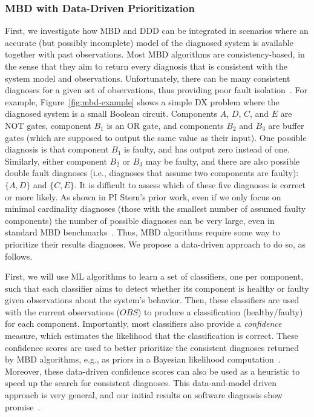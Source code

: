\documentclass[12pt]{article}
\begin{document}
\subsubsection{MBD with Data-Driven Prioritization} 
First, we investigate how MBD and DDD can be integrated in scenarios where an accurate (but possibly incomplete) model of the diagnosed system is available together with past observations. 
Most MBD algorithms are consistency-based, in the sense that they aim to return every diagnosis  that is consistent with the system model and observations. 
Unfortunately, there can be many consistent diagnoses for a given set of observations, thus providing poor fault isolation~\cite{stern2015many}. 
For example, Figure~\ref{fig:mbd-example} shows a simple DX problem where the diagnosed system is a small Boolean circuit. Components $A$, $D$, $C$, and $E$ are NOT gates, component $B_1$ is an OR gate, and components $B_2$ and $B_3$ are buffer gates (which are supposed to output the same value as their input). One possible diagnosis is that component $B_1$ is faulty, and has output zero instead of one. Similarly, either component $B_2$ or $B_3$ may be faulty, 
and there are also possible double fault diagnoses (i.e., diagnoses that assume two components are faulty): $\{ A,D \}$ and $\{C,E\}$. It is difficult to assess which of these five diagnoses is correct or more likely. 
As shown in PI Stern's prior work, even if we only focus on minimal cardinality diagnoses (those with the smallest number of assumed faulty components) the number of possible diagnoses can be very large, even in standard MBD benchmarks~\cite{stern2015many}. Thus, MBD algorithms require some way to prioritize their results diagnoses. We propose a data-driven approach to do so, as follows. 


First, we will use ML algorithms to learn a set of classifiers, one per component, such that each classifier aims to detect whether its component is healthy or faulty given observations about the system's behavior. 
Then, these classifiers are used with the current observations ($OBS$) to produce a classification (healthy/faulty) for each component. Importantly, most classifiers also provide a {\em confidence} measure, which estimates the likelihood that the classification is correct. These confidence scores are used 
to better prioritize the consistent diagnoses returned by MBD algorithms, e.g., as priors in a Bayesian likelihood computation~\cite{abreu2009new}. Moreover, these data-driven confidence scores can also be used as a heuristic to speed up the search for consistent diagnoses. This data-and-model driven approach is very general, and our initial results on software  diagnosis show promise~\cite{elmishali2016dataAugmented}. 
\end{document}
